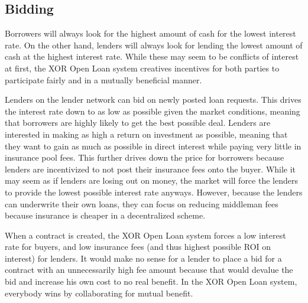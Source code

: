 \documentclass[twoside]{article}
\begin{document}
\subsection{Bidding}
Borrowers will always look for the highest amount of cash for the lowest interest rate. On the other hand, lenders will always look for lending the lowest amount of cash at the highest interest rate. While these may seem to be conflicts of interest at first, the XOR Open Loan system creatives incentives for both parties to participate fairly and in a mutually beneficial manner. 

Lenders on the lender network can bid on newly posted loan requests. This drives the interest rate down to as low as possible given the market conditions, meaning that borrowers are highly likely to get the best possible deal. Lenders are interested in making as high a return on investment as possible, meaning that they want to gain as much as possible in direct interest while paying very little in insurance pool fees. This further drives down the price for borrowers because lenders are incentivized to not post their insurance fees onto the buyer. While it may seem as if lenders are losing out on money, the market will force the lenders to provide the lowest possible interest rate anyways. However, because the lenders can underwrite their own loans, they can focus on reducing middleman fees because insurance is cheaper in a decentralized scheme. 

When a contract is created, the XOR Open Loan system forces a low interest rate for buyers, and low insurance fees (and thus highest possible ROI on interest) for lenders. It would make no sense for a lender to place a bid for a contract with an unnecessarily high fee amount because that would devalue the bid and increase his own cost to no real benefit. In the XOR Open Loan system, everybody wins by collaborating for mutual benefit. 
\end{document}
